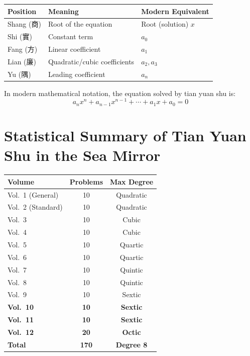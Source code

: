 \documentclass[11pt,a4paper]{book}
\begin{document}
\begin{center}
\begin{tabular}{l|l|l}
\toprule
\textbf{Position} & \textbf{Meaning} & \textbf{Modern Equivalent} \\
\midrule
Shang (商) & Root of the equation & Root (solution) $x$ \\
Shi (實) & Constant term & $a_0$ \\
Fang (方) & Linear coefficient & $a_1$ \\
Lian (廉) & Quadratic/cubic coefficients & $a_2, a_3$ \\
Yu (隅) & Leading coefficient & $a_n$ \\
\bottomrule
\end{tabular}
\end{center}

In modern mathematical notation, the equation solved by tian yuan shu is:
$$a_n x^n + a_{n-1} x^{n-1} + \cdots + a_1 x + a_0 = 0$$

\section{Statistical Summary of Tian Yuan Shu in the Sea Mirror}

\begin{center}
\begin{tabular}{l|c|c}
\toprule
\textbf{Volume} & \textbf{Problems} & \textbf{Max Degree} \\
\midrule
Vol.\ 1 (General) & 10 & Quadratic \\
Vol.\ 2 (Standard) & 10 & Quadratic \\
Vol.\ 3 & 10 & Cubic \\
Vol.\ 4 & 10 & Cubic \\
Vol.\ 5 & 10 & Quartic \\
Vol.\ 6 & 10 & Quartic \\
Vol.\ 7 & 10 & Quintic \\
Vol.\ 8 & 10 & Quintic \\
Vol.\ 9 & 10 & Sextic \\
\textbf{Vol.\ 10} & \textbf{10} & \textbf{Sextic} \\
\textbf{Vol.\ 11} & \textbf{10} & \textbf{Sextic} \\
\textbf{Vol.\ 12} & \textbf{20} & \textbf{Octic} \\
\midrule
\textbf{Total} & \textbf{170} & \textbf{Degree 8} \\
\bottomrule
\end{tabular}
\end{center}
\end{document}
